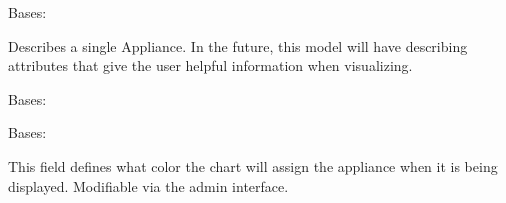 \documentclass[letterpaper,10pt,english]{sphinxmanual}
\begin{document}
\begin{fulllineitems}
\label{modules/microdata:microdata.models.Appliance}
Bases: 

Describes a single Appliance. In the future, this model will have describing attributes that give the user helpful information when visualizing.

\begin{fulllineitems}
\label{modules/microdata:microdata.models.Appliance.DoesNotExist}
Bases: 

\end{fulllineitems}


\begin{fulllineitems}
\label{modules/microdata:microdata.models.Appliance.MultipleObjectsReturned}
Bases: 

\end{fulllineitems}


\begin{fulllineitems}
\label{modules/microdata:microdata.models.Appliance.chart_color}
This field defines what color the chart will assign the appliance when it is being displayed. Modifiable via the admin interface.

\end{fulllineitems}


\begin{fulllineitems}
\label{modules/microdata:microdata.models.Appliance.circuittype_set}
\end{fulllineitems}


\begin{fulllineitems}
\label{modules/microdata:microdata.models.Appliance.eventnotification_set}
\end{fulllineitems}


\end{fulllineitems}
\end{document}
